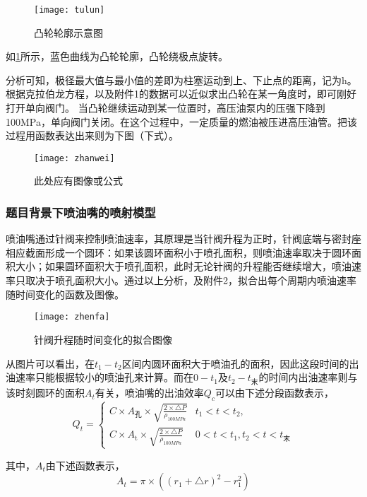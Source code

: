 \documentclass{cumcmthesis}
\begin{document}
\begin{figure}[!h]
	\centering 
	\texttt{[image: tulun]}
	\caption{凸轮轮廓示意图}
	\label{fig:tulun-picture}
\end{figure}

如\cref{fig:tulun-picture}所示，蓝色曲线为凸轮轮廓，凸轮绕极点旋转。

分析可知，极径最大值与最小值的差即为柱塞运动到上、下止点的距离，记为h。根据克拉伯龙方程，以及附件1的数据可以近似求出凸轮在某一角度时，即可刚好打开单向阀门。 当凸轮继续运动到某一位置时，高压油泵内的压强下降到100MPa，单向阀门关闭。在这个过程中，一定质量的燃油被压进高压油管。把该过程用函数表达出来则为下图（下式）。
\begin{figure}[!h]
	\centering 
	\texttt{[image: zhanwei]}
	\caption{此处应有图像或公式}
	\label{fig:f(t)-picture}
\end{figure}

\subsubsection{题目背景下喷油嘴的喷射模型}\label{case3}
喷油嘴通过针阀来控制喷油速率，其原理是当针阀升程为正时，针阀底端与密封座相应截面形成一个圆环：如果该圆环面积小于喷孔面积，则喷油速率取决于圆环面积大小；如果圆环面积大于喷孔面积，此时无论针阀的升程能否继续增大，喷油速率只取决于喷孔面积大小。通过以上分析，及附件2，拟合出每个周期内喷油速率随时间变化的函数及图像。

\begin{figure}[!h]
	\centering 
	\texttt{[image: zhenfa]}
	\caption{针阀升程随时间变化的拟合图像}
	\label{fig:Q(t)-picture}
\end{figure}

从图片可以看出，在$t_{1}-t_{2}$区间内圆环面积大于喷油孔的面积，因此这段时间的出油速率只能根据较小的喷油孔来计算。而在$0-t_{1}$及$t_{2}-t_{\text{末}}$的时间内出油速率则与该时刻圆环的面积$A_{t}$有关，喷油嘴的出油效率$Q_{c}$可以由下述分段函数表示，
\begin{equation}
Q_{t} =
\begin{cases}
C\times A_{\text{孔}}\times \sqrt{\frac{2\times \triangle P}{\rho_{100MPa}}} &   t_{1}<t<t_{2} ,\\
C\times A_{\text{t}}\times \sqrt{\frac{2\times \triangle P}{\rho_{100MPa}}} &   0<t<t_{1},t_{2}<t<t_{\text{末}}
\end{cases}\label{eq:ques3-1}
\end{equation}

其中，$A_{t}$由下述函数表示，
\begin{equation*}
A_{t} = \pi\times ((r_{1}+\triangle r)^{2}-r_{1}^{2})\label{eq:ques3-2}	
\end{equation*}
\end{document}
